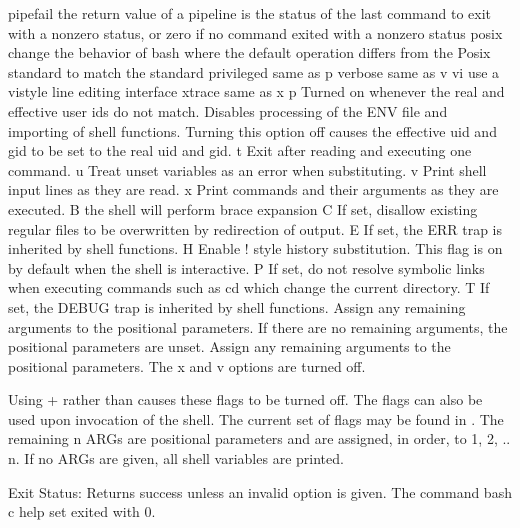 \documentclass[letterpaper,12pt,english]{sphinxmanual}
\begin{document}
\begin{sphinxVerbatim}[commandchars=\\\{\}]
              pipefail     the return value of a pipeline is the status of
                           the last command to exit with a non\PYGZhy{}zero status,
                           or zero if no command exited with a non\PYGZhy{}zero status
              posix        change the behavior of bash where the default
                           operation differs from the Posix standard to
                           match the standard
              privileged   same as \PYGZhy{}p
              verbose      same as \PYGZhy{}v
              vi           use a vi\PYGZhy{}style line editing interface
              xtrace       same as \PYGZhy{}x
      \PYGZhy{}p  Turned on whenever the real and effective user ids do not match.
          Disables processing of the \PYGZdl{}ENV file and importing of shell
          functions.  Turning this option off causes the effective uid and
          gid to be set to the real uid and gid.
      \PYGZhy{}t  Exit after reading and executing one command.
      \PYGZhy{}u  Treat unset variables as an error when substituting.
      \PYGZhy{}v  Print shell input lines as they are read.
      \PYGZhy{}x  Print commands and their arguments as they are executed.
      \PYGZhy{}B  the shell will perform brace expansion
      \PYGZhy{}C  If set, disallow existing regular files to be overwritten
          by redirection of output.
      \PYGZhy{}E  If set, the ERR trap is inherited by shell functions.
      \PYGZhy{}H  Enable ! style history substitution.  This flag is on
          by default when the shell is interactive.
      \PYGZhy{}P  If set, do not resolve symbolic links when executing commands
          such as cd which change the current directory.
      \PYGZhy{}T  If set, the DEBUG trap is inherited by shell functions.
      \PYGZhy{}\PYGZhy{}  Assign any remaining arguments to the positional parameters.
          If there are no remaining arguments, the positional parameters
          are unset.
      \PYGZhy{}   Assign any remaining arguments to the positional parameters.
          The \PYGZhy{}x and \PYGZhy{}v options are turned off.

    Using + rather than \PYGZhy{} causes these flags to be turned off.  The
    flags can also be used upon invocation of the shell.  The current
    set of flags may be found in \PYGZdl{}\PYGZhy{}.  The remaining n ARGs are positional
    parameters and are assigned, in order, to \PYGZdl{}1, \PYGZdl{}2, .. \PYGZdl{}n.  If no
    ARGs are given, all shell variables are printed.

    Exit Status:
    Returns success unless an invalid option is given.
The command \PYGZdq{}bash \PYGZhy{}c \PYGZdq{}help set\PYGZdq{}\PYGZdq{} exited with 0.
\end{sphinxVerbatim}
\end{document}
